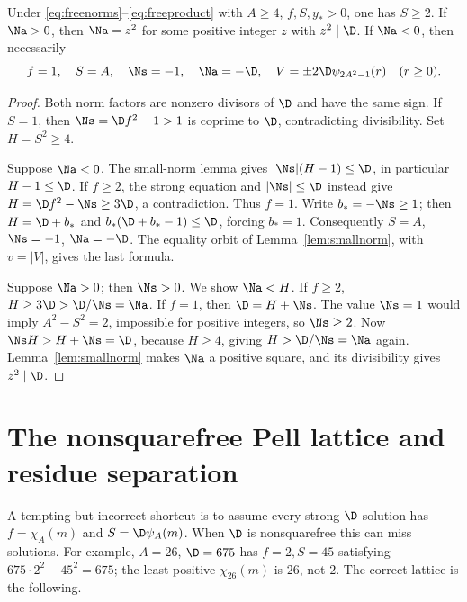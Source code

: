 \begin{proposition}\label{prop:signs}
Under \eqref{eq:freenorms}--\eqref{eq:freeproduct} with $A\ge4$,
$f,S,y_*>0$, one has $S\ge2$. If $\Na>0$, then
$\Na=z^2$ for some positive integer $z$ with $z^2\mid\D$.
If $\Na<0$, then necessarily
\begin{equation}\label{eq:negativebranch}
 f=1,\quad S=A,\quad \Ns=-1,\quad \Na=-\D,\quad
 V=\pm2\D\psi_{2A^2-1}(r)\quad(r\ge0).
\end{equation}
\end{proposition}
\begin{proof}
Both norm factors are nonzero divisors of $\D$ and have the same
sign. If $S=1$, then $\Ns=\D f^2-1>1$ is coprime to $\D$,
contradicting divisibility. Set $H=S^2\ge4$.

Suppose $\Na<0$. The small-norm lemma gives
$|\Ns|(H-1)\le\D$, in particular $H-1\le\D$.
If $f\ge2$, the strong equation and $|\Ns|\le\D$ instead give
$H=\D f^2-\Ns\ge3\D$, a contradiction.
Thus $f=1$. Write $b_*=-\Ns\ge1$; then $H=\D+b_*$ and
$b_*(\D+b_*-1)\le\D$, forcing $b_*=1$.
Consequently $S=A$, $\Ns=-1$, $\Na=-\D$.
The equality orbit of Lemma~\ref{lem:smallnorm}, with $v=|V|$,
gives the last formula.

Suppose $\Na>0$; then $\Ns>0$. We show $\Na<H$.
If $f\ge2$, $H\ge3\D>\D/\Ns=\Na$.
If $f=1$, then $\D=H+\Ns$. The value $\Ns=1$ would imply
$A^2-S^2=2$, impossible for positive integers, so $\Ns\ge2$.
Now $\Ns H>H+\Ns=\D$, because $H\ge4$, giving
$H>\D/\Ns=\Na$ again. Lemma~\ref{lem:smallnorm} makes
$\Na$ a positive square, and its divisibility gives $z^2\mid\D$.
\end{proof}

\section{The nonsquarefree Pell lattice and residue separation}
\label{sec:lattice}
A tempting but incorrect shortcut is to assume every strong-$\D$
solution has $f=\chi_A(m)$ and $S=\D\psi_A(m)$. When $\D$
is nonsquarefree this can miss solutions. For example,
$A=26$, $\D=675$ has $f=2,S=45$ satisfying
$675\cdot2^2-45^2=675$; the least positive $\chi_{26}(m)$
is $26$, not $2$. The correct lattice is the following.

